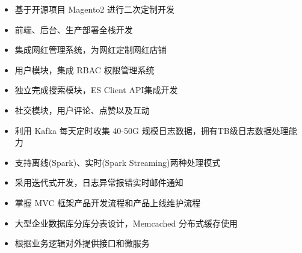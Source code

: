 \documentclass{resume}
\begin{document}
    \begin{onehalfspacing}
        \begin{itemize}
            \item 基于开源项目 Magento2 进行二次定制开发
            \item 前端、后台、生产部署全栈开发
            \item 集成网红管理系统，为网红定制网红店铺
        \end{itemize}
    \end{onehalfspacing}
    \blankline{ }

    \begin{onehalfspacing}
        \begin{itemize}
            \item 用户模块，集成 RBAC 权限管理系统
            \item 独立完成搜索模块，ES Client API集成开发
            \item 社交模块，用户评论、点赞以及互动
        \end{itemize}
    \end{onehalfspacing}
    \blankline{ }

    \begin{onehalfspacing}
        \begin{itemize}
            \item 利用 Kafka 每天定时收集 40-50G 规模日志数据，拥有TB级日志数据处理能力
            \item 支持离线(Spark)、实时(Spark Streaming)两种处理模式
            \item 采用迭代式开发，日志异常报错实时邮件通知
        \end{itemize}
    \end{onehalfspacing}
    \blankline{ }

    \begin{onehalfspacing}
        \begin{itemize}
            \item 掌握 MVC 框架产品开发流程和产品上线维护流程
            \item 大型企业数据库分库分表设计，Memcached 分布式缓存使用
            \item 根据业务逻辑对外提供接口和微服务
        \end{itemize}
    \end{onehalfspacing}
    \blankline{ }
\end{document}
